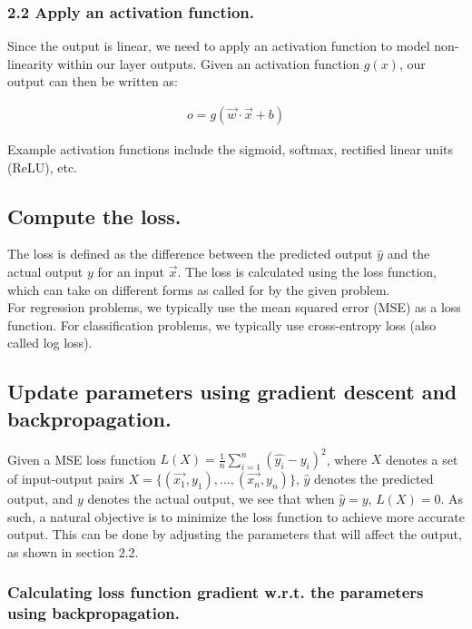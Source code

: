\documentclass[11pt]{article}
\begin{document}
\subsubsection{2.2 Apply an activation
function.}\label{apply-an-activation-function.}

Since the output is linear, we need to apply an activation function to
model non-linearity within our layer outputs. Given an activation
function \(g(x)\), our output can then be written as:

\begin{align*}
o = g(\vec{w} \cdot \vec{x} + b)
\end{align*}

Example activation functions include the sigmoid, softmax, rectified
linear units (ReLU), etc.

    \subsection{Compute the loss.}\label{compute-the-loss.}

The loss is defined as the difference between the predicted output
\(\hat{y}\) and the actual output \(y\) for an input \(\vec{x}\). The
loss is calculated using the loss function, which can take on different
forms as called for by the given problem.\\

For regression problems, we typically use the mean squared error (MSE)
as a loss function. For classification problems, we typically use
cross-entropy loss (also called log loss).

    \subsection{Update parameters using gradient descent and
backpropagation.}\label{update-parameters-using-gradient-descent-and-backpropagation.}

Given a MSE loss function
\(L(X) = \frac{1}{n}\sum_{i=1}^{n}{(\hat{y_i} - y_i)^2}\), where \(X\)
denotes a set of input-output pairs
\(X=\{(\vec{x_1},y_1),...,(\vec{x_n},y_n)\}\), \(\hat{y}\) denotes the
predicted output, and \({y}\) denotes the actual output, we see that
when \(\hat{y} = y\), \(L(X) = 0\). As such, a natural objective is to
minimize the loss function to achieve more accurate output. This can be
done by adjusting the parameters that will affect the output, as shown
in section 2.2.

\subsubsection{Calculating loss function gradient w.r.t. the
parameters using
backpropagation.}\label{calculating-loss-function-gradient-w.r.t.-the-parameters-using-backpropagation.}
\end{document}
